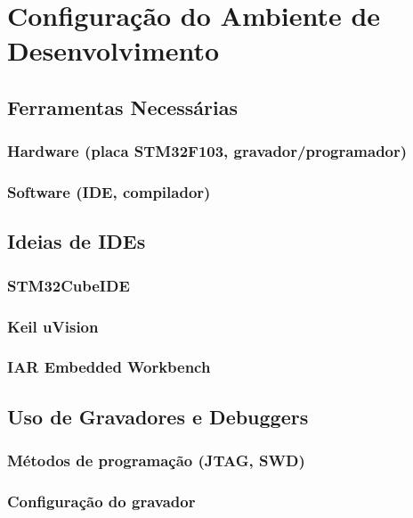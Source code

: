 \section{Configuração do Ambiente de Desenvolvimento}

\subsection{Ferramentas Necessárias}
\subsubsection{Hardware (placa STM32F103, gravador/programador)}
\subsubsection{Software (IDE, compilador)}

\subsection{Ideias de IDEs}
\subsubsection{STM32CubeIDE}
\subsubsection{Keil uVision}
\subsubsection{IAR Embedded Workbench}

\subsection{Uso de Gravadores e Debuggers}
\subsubsection{Métodos de programação (JTAG, SWD)}
\subsubsection{Configuração do gravador}